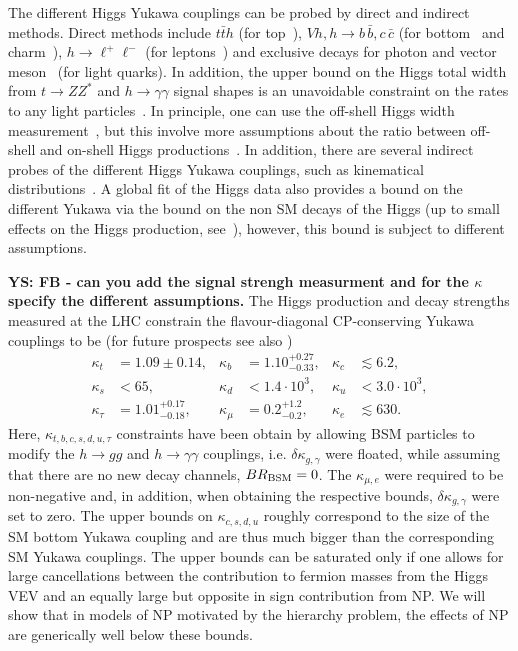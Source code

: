\documentclass[../report.tex]{subfiles}
\begin{document}
The different Higgs Yukawa couplings can be probed by direct and indirect methods. 
Direct methods include $t\bar{t}h$ (for top~\cite{}), $Vh, h\to b \, \bar{b},c \, \bar{c} $ (for bottom~\cite{} and charm~\cite{}), $h\to \ell^+ \ell^-$ (for leptons~\cite{}) and exclusive decays for photon and vector meson~\cite{} (for light quarks). 
In addition, the upper bound on the Higgs total width from $t\to ZZ^*$ and $h\to\gamma\gamma$ signal shapes is an unavoidable constraint on the rates to any light particles~\cite{Perez:2015aoa}.
In principle, one can use the off-shell Higgs width measurement~\cite{1405.0285,Englert:2014ffa}, but this involve more assumptions about the ratio between off-shell and on-shell Higgs productions~\cite{}. 
In addition, there are several indirect probes of the different Higgs Yukawa couplings, such as kinematical distributions~\cite{Soreq:2016rae,Bishara:2016jga}.
A global fit of the Higgs data also provides a bound on the different Yukawa via the bound on the non SM decays of the Higgs (up to small effects on the Higgs production, see~\cite{Delaunay:2013pja,Kagan:2014ila,Perez:2015aoa}), however, this bound is subject to different assumptions. 



{\bf YS: FB - can you add the signal strengh measurment and for the $\kappa$ specify the different assumptions.}
The Higgs production and decay strengths measured at the LHC constrain the flavour-diagonal CP-conserving Yukawa couplings to be \cite{CMS-PAS-HIG-15-002,CMS-PAS-HIG-17-031,Perez:2015aoa,Kagan:2014ila,Altmannshofer:2015qra} (for future prospects see also \cite{Perez:2015lra,Brivio:2015fxa,Koenig:2015pha,Aad:2015sda,Bodwin:2014bpa,Bodwin:2013gca})
\begin{align}
\label{eq:kappalimits}
\kappa_t&=1.09\pm0.14, & \kappa_b&=1.10^{+0.27}_{-0.33},&\kappa_c&\lesssim 6.2,\nonumber\\
\kappa_s&< 65,  &\kappa_d&<1.4 \cdot 10^3, &\kappa_u&<3.0 \cdot 10^{3},\\
 \kappa_\tau&=1.01^{+0.17}_{-0.18},  &\kappa_\mu&=0.2^{+1.2}_{-0.2},  &\kappa_e& \lesssim 630.\nonumber
\end{align}
Here, $\kappa_{t,b,c,s,d,u,\tau}$ constraints have been obtain by allowing BSM particles to modify the $h\to gg$ and $h\to \gamma\gamma$
couplings, i.e. $\delta\kappa_{g,\gamma}$ were floated, while assuming
that there are no new decay channels, $BR_{\rm BSM}=0$. 
The $\kappa_{\mu,e}$ were required to be non-negative and, in addition,
when obtaining the respective bounds, $\delta\kappa_{g,\gamma}$ were
set to zero.  
The upper bounds on $\kappa_{c,s,d,u}$ roughly
correspond to the size of the SM bottom Yukawa coupling and are thus much bigger than the corresponding SM Yukawa couplings. The upper bounds can be saturated only if one allows for large cancellations between the
contribution to fermion masses from the Higgs VEV and an equally large
but opposite in sign contribution from NP. We will show that in models
of NP motivated by the hierarchy problem, the effects of NP are
generically well below these bounds.
\end{document}

